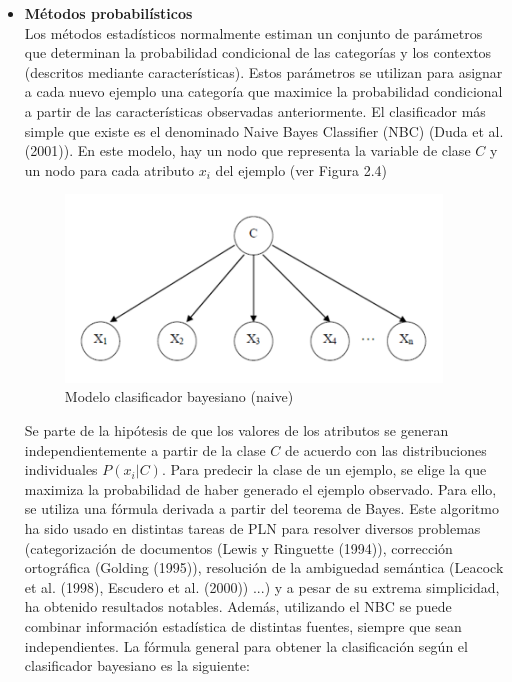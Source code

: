 \begin{itemize}
  \item \textbf{Métodos probabilísticos} \\
  Los métodos estadísticos normalmente estiman un conjunto de parámetros que determinan la probabilidad condicional de las categorías y los contextos (descritos mediante características). Estos parámetros se utilizan para asignar a cada nuevo ejemplo una categoría que maximice la probabilidad condicional a partir de las características observadas anteriormente. El clasificador más simple que existe es el denominado Naive Bayes Classifier (NBC) (Duda et al. (2001)). En este modelo, hay un nodo que representa la variable de clase $C$ y un nodo para cada atributo $x_i$ del ejemplo (ver Figura 2.4)

  \begin{figure}[h!]
    \begin{center}
    \includegraphics[angle=0, width=10cm]{Graficos/bayesiano}
    \caption{Modelo clasificador bayesiano (naive)}
    \label{fig:bayesiano}
    \end{center}
  \end{figure}
  Se parte de la hipótesis de que los valores de los atributos se generan independientemente a partir de la clase $C$ de acuerdo con las distribuciones individuales $P(x_i|C)$. Para predecir la clase de un ejemplo, se elige la que maximiza la probabilidad de haber generado el ejemplo observado. Para ello, se utiliza una fórmula derivada a partir del teorema de Bayes. Este algoritmo ha sido usado en distintas tareas de PLN para resolver diversos problemas (categorización de documentos (Lewis y Ringuette (1994)), corrección ortográfica (Golding (1995)), resolución de la ambiguedad semántica (Leacock et al. (1998), Escudero et al. (2000)) ...) y a pesar de su extrema simplicidad, ha obtenido resultados notables. Además, utilizando el NBC se puede combinar información estadística de distintas fuentes, siempre que sean independientes. La fórmula general para obtener la clasificación según el clasificador bayesiano es la siguiente:


\end{itemize}
